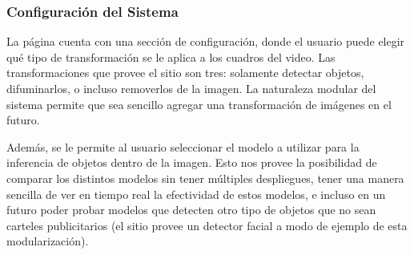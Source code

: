 \documentclass[a4paper]{article}
\begin{document}
\subsubsection{Configuración del Sistema}

La página cuenta con una sección de configuración, donde el usuario puede elegir qué tipo de transformación se le aplica a los cuadros del video. Las transformaciones que provee el sitio son tres: solamente detectar objetos, difuminarlos, o incluso removerlos de la imagen. La naturaleza modular del sistema permite que sea sencillo agregar una transformación de imágenes en el futuro.

\begin{figure}[H]
\end{figure}

Además, se le permite al usuario seleccionar el modelo a utilizar para la inferencia de objetos dentro de la imagen. Esto nos provee la posibilidad de comparar los distintos modelos sin tener múltiples despliegues, tener una manera sencilla de ver en tiempo real la efectividad de estos modelos, e incluso en un futuro poder probar modelos que detecten otro tipo de objetos que no sean carteles publicitarios (el sitio provee un detector facial a modo de ejemplo de esta modularización).
\end{document}

